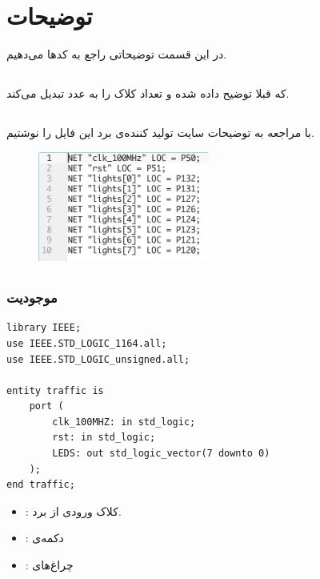 \documentclass[dvipsnames, svgnames, x11names, a4paper, 11pt]{article}
\begin{document}
\section{توضیحات}
در این قسمت توضیحاتی راجع به کد‌ها می‌دهیم.

\subsection{}
که قبلا توضیح داده شده و تعداد کلاک 
را به عدد
تبدیل می‌کند.
\newpage
\subsection{}
با مراجعه به توضیحات سایت تولید کننده‌ی برد این فایل را نوشتیم.
\begin{figure}[H]
\begin{center}
\includegraphics[width=0.5\textwidth, height=0.23\textheight]{./images/ucf}
\end{center}
\end{figure}

\subsection{}
\subsubsection{موجودیت }
\begin{latin}
\begin{lstlisting}
library IEEE;
use IEEE.STD_LOGIC_1164.all;
use IEEE.STD_LOGIC_unsigned.all;

entity traffic is
    port (
        clk_100MHZ: in std_logic;
        rst: in std_logic;
        LEDS: out std_logic_vector(7 downto 0)
    );
end traffic;
\end{lstlisting}
\end{latin}
\begin{itemize}
\item {}:
کلاک ورودی از برد.

\item {}:
دکمه‌ی 

\item {}:
چراغ‌های 
\end{itemize}
\newpage
\end{document}
